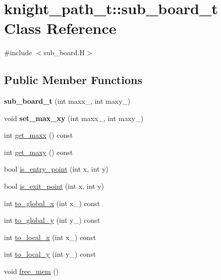 \hypertarget{classknight__path__t_1_1sub__board__t}{\section{knight\-\_\-path\-\_\-t\-:\-:sub\-\_\-board\-\_\-t Class Reference}
\label{classknight__path__t_1_1sub__board__t}
}


{\ttfamily \#include $<$sub\-\_\-board.\-H$>$}

\subsection*{Public Member Functions}
\begin{DoxyCompactItemize}
\item 
\hypertarget{classknight__path__t_1_1sub__board__t_a31455a41388e60787ff8b9d2115aa163}{{\bfseries sub\-\_\-board\-\_\-t} (int maxx\-\_\-, int maxy\-\_\-)}\label{classknight__path__t_1_1sub__board__t_a31455a41388e60787ff8b9d2115aa163}

\item 
\hypertarget{classknight__path__t_1_1sub__board__t_aba8e7595b93eb9d83e09b07da88ae161}{void {\bfseries set\-\_\-max\-\_\-xy} (int maxx\-\_\-, int maxy\-\_\-)}\label{classknight__path__t_1_1sub__board__t_aba8e7595b93eb9d83e09b07da88ae161}

\item 
int \hyperlink{classknight__path__t_1_1sub__board__t_aa3cd749eb4514c1077f1dd2546df37b6}{get\-\_\-maxx} () const 
\item 
int \hyperlink{classknight__path__t_1_1sub__board__t_ae52fbc307d48bd12fee6d584d049a695}{get\-\_\-maxy} () const 
\item 
bool \hyperlink{classknight__path__t_1_1sub__board__t_a0b46a275bb19527b6a1a7d217df1af33}{is\-\_\-entry\-\_\-point} (int x, int y)
\item 
bool \hyperlink{classknight__path__t_1_1sub__board__t_a0edd6d94f554b1bf6d9190c19dc50fcc}{is\-\_\-exit\-\_\-point} (int x, int y)
\item 
int \hyperlink{classknight__path__t_1_1sub__board__t_acc1f9c491c2dd3e27ffca4be50cb8264}{to\-\_\-global\-\_\-x} (int x\-\_\-) const 
\item 
int \hyperlink{classknight__path__t_1_1sub__board__t_a73d717615bb05d655f117e0a0661bd16}{to\-\_\-global\-\_\-y} (int y\-\_\-) const 
\item 
int \hyperlink{classknight__path__t_1_1sub__board__t_aff729590a51749ece89b5aa3accdf677}{to\-\_\-local\-\_\-x} (int x\-\_\-) const 
\item 
int \hyperlink{classknight__path__t_1_1sub__board__t_a35530f6117bb66fb2cdf5d195e8333cc}{to\-\_\-local\-\_\-y} (int y\-\_\-) const 
\item 
void \hyperlink{classknight__path__t_1_1sub__board__t_a6207111b84fcc329164c1fc2725222fc}{free\-\_\-mem} ()
\end{DoxyCompactItemize}
